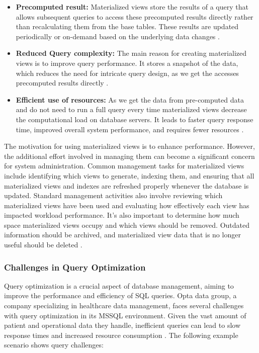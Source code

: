 \begin{itemize}
    \item\textbf{Precomputed result:} Materialized views store the results of a query that allows subsequent queries to access these precomputed results directly rather than recalculating them from the base tables. These results are updated periodically or on-demand based on the underlying data changes \cite{khan-2023,Risingwave-no-date}.
    
    \item\textbf{Reduced Query complexity:} The main reason for creating materialized views is to improve query performance. It stores a snapshot of the data, which reduces the need for intricate query design, as we get the accesses precomputed results directly \cite{Risingwave-no-date,Databricks-no-date}.
    
    \item\textbf{Efficient use of resources:} As we get the data from pre-computed data and do not need to run a full query every time materialized views decrease the computational load on database servers. It leads to faster query response time, improved overall system performance, and requires fewer resources \cite{google-no-date, khan-2023}.
    
\end{itemize}\vspace{.4cm}

The motivation for using materialized views is to enhance performance. However, the additional effort involved in managing them can become a significant concern for system administration. Common management tasks for materialized views include identifying which views to generate, indexing them, and ensuring that all materialized views and indexes are refreshed properly whenever the database is updated. Standard management activities also involve reviewing which materialized views have been used and evaluating how effectively each view has impacted workload performance. It's also important to determine how much space materialized views occupy and which views should be removed. Outdated information should be archived, and materialized view data that is no longer useful should be deleted \cite{Ashadevi2008CostEA,1363763}.

\subsubsection{Challenges in Query Optimization} Query optimization is a crucial aspect of database management, aiming to improve the performance and efficiency of SQL queries. Opta data group, a company specializing in healthcare data management, faces several challenges with query optimization in its MSSQL environment. Given the vast amount of patient and operational data they handle, inefficient queries can lead to slow response times and increased resource consumption \cite{Flipico-2024}. The following example scenario shows query challenges:\vspace{.4cm}


